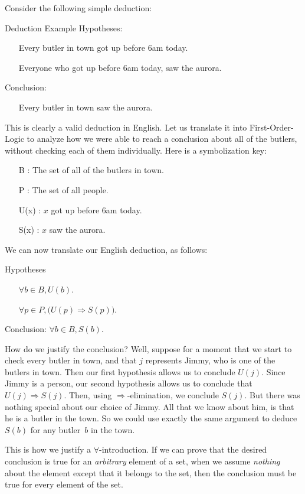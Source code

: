 \documentclass[../MATH-2000-Notes.tex]{subfiles}
\begin{document}
Consider the following simple deduction:
\begin{commentbox}{Deduction Example}
    Hypotheses:
    \begin{itemize}
        \item[]Every butler in town got up before 6am today.
        \item[]Everyone who got up before 6am today, saw the aurora.
    \end{itemize}
    Conclusion:
    \begin{itemize}
        \item[] Every butler in town saw the aurora.
    \end{itemize}
\end{commentbox}
This is clearly a valid deduction in English.  Let us translate it into First-Order-Logic to analyze how we were able to reach a conclusion about all of the butlers, without checking each of them individually.  Here is a symbolization key:
\begin{itemize}
    \item[B]: The set of all of the butlers in town.
    \item[P]: The set of all people.
    \item[U(x)]: $x$ got up before 6am today.
    \item[S(x)]: $x$ saw the aurora.
\end{itemize}
We can now translate our English deduction, as follows:

Hypotheses
\begin{itemize}
    \item[]$\forall b \in B, U(b)$. 
    \item[]$\forall p \in P, \bigl( U(p) \Rightarrow S(p) \bigr)$.
\end{itemize}
Conclusion: $\forall b \in B, S(b)$.    

How do we justify the conclusion?  Well, suppose for a moment that we start to check every butler in town, and that $j$ represents Jimmy, who is one of the butlers in town.  Then our first hypothesis allows us to conclude $U(j)$.  Since Jimmy is a person, our second hypothesis allows us to conclude that $U(j) \Rightarrow S(j)$. Then, using $\Rightarrow$-elimination, we conclude $S(j)$.  But there was nothing special about our choice of Jimmy.  All that we know about him, is that he is a butler in the town.  So we could use exactly the same argument to deduce $S(b)$ for any butler~$b$ in the town.

This is how we justify a $\forall$-introduction.  If we can prove that the desired conclusion is true for an \emph{arbitrary} element of a set, when we assume \emph{nothing} about the element except that it belongs to the set, then the conclusion must be true for every element of the set.
\end{document}
